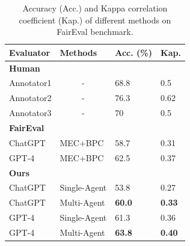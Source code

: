 \begin{table}[t]
\caption{Accuracy (Acc.) and Kappa correlation coefficient (Kap.) of different methods on FairEval benchmark. }
\label{tab:faireval_results}
\begin{center}
\begin{tabular}{l|l|l|l}
\hline
\textbf{Evaluator}  & \textbf{Methods}      & \textbf{Acc. (\%)} & \textbf{Kap.} \\ \hline
\multicolumn{4}{l}{\textbf{Human}}                    \\ 
Annotator1 & \multicolumn{1}{c|}{-}    & 68.8      & 0.5  \\
Annotator2 & \multicolumn{1}{c|}{-}    & 76.3      & 0.62 \\ 
Annotator3 & \multicolumn{1}{c|}{-}    & 70        & 0.5  \\ \hline
\multicolumn{4}{l}{\textbf{FairEval}}                 \\ 
ChatGPT    & MEC+BPC      & 58.7      & 0.31 \\
GPT-4      & MEC+BPC      & 62.5      & 0.37 \\ \hline
\multicolumn{4}{l}{\textbf{Ours}}                     \\ 
ChatGPT    & Single-Agent & 53.8      &   0.27   \\
ChatGPT    & Multi-Agent  & \textbf{60.0}      & \textbf{0.33}     \\
GPT-4      & Single-Agent & 61.3         & 0.36     \\
GPT-4      & Multi-Agent  & \textbf{63.8}      & \textbf{0.40}     
\end{tabular}
\end{center}
\end{table}



